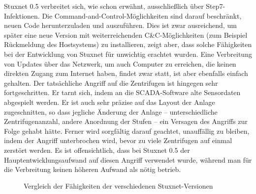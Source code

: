 \documentclass[a4paper]{article}
\begin{document}
Stuxnet 0.5 verbreitet sich, wie schon erwähnt, ausschließlich über Step7-Infektionen.
Die Command-and-Control-Möglichkeiten sind darauf beschränkt, neuen Code herunterzuladen und auszuführen.
Dies ist zwar ausreichend, um später eine neue Version mit weiterreichenden C\&C-Möglichkeiten (zum Beispiel Rück\-mel\-dung des Hostsystems) zu installieren,
zeigt aber, dass solche Fähigkeiten bei der Entwicklung von Stuxnet für unwichtig erachtet wurden.
Eine Verbreitung von Updates über das Netzwerk, um auch Computer zu erreichen, die keinen direkten Zugang zum Internet haben,
findet zwar statt, ist aber ebenfalls einfach gehalten.
Der tatsächliche Angriff auf die Zentrifugen ist hingegen sehr fortgeschritten.
Er tarnt sich, indem an die SCADA-Software alte Sensordaten abgespielt werden.
Er ist auch sehr präzise auf das Layout der Anlage zugeschnitten, so dass jegliche Änderung der Anlage – unterschiedliche Zentrifugenanzahl, andere Anordnung der Stufen – ein Versagen des Angriffs zur Folge gehabt hätte.
Ferner wird sorgfältig darauf geachtet, unauffällig zu bleiben, indem der Angriff unterbrochen wird, bevor zu viele Zentrifugen auf einmal zerstört werden.
Es ist offensichtlich, dass bei Stuxnet 0.5 der Hauptentwicklungsaufwand auf diesen Angriff verwendet wurde,
während man für die Verbreitung keinen höheren Aufwand als nötig betrieb.

\begin{figure}
  \centering
  
  \caption{Vergleich der Fähigkeiten der verschiedenen Stuxnet-Versionen\label{fig:vergleich}}
\end{figure}
\end{document}
